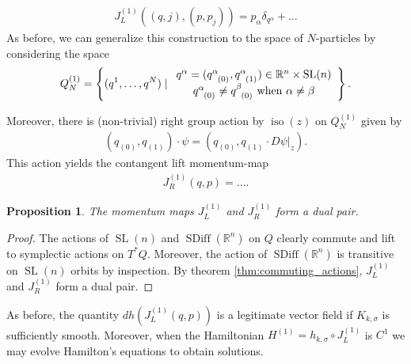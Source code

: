\documentclass[12pt]{amsart}
\newcommand{\R}{\ensuremath{\mathbb{R}}}
\newtheorem{prop}[thm]{Proposition}
\DeclareMathOperator{\SDiff}{SDiff}
\DeclareMathOperator{\SL}{SL}
\DeclareMathOperator{\iso}{iso}
\begin{document}
  \begin{align*}
    J_L^{(1)}( (q, j ),(p, p_j) ) = p_\alpha \delta_{q^{\alpha}} + \dots
  \end{align*}
  As before, we can generalize this construction to the space of
  $N$-particles by considering the space
  \begin{align*}
    Q^{(1)}_N = \left\{  ( q^1 , \dots, q^N ) \mid 
      \begin{array}{c}
        q^\alpha = (q\indices{^\alpha_{(0)} } ,q\indices{^\alpha_{(1)} } ) \in \R^n \times \SL(n) \\
        q\indices{^\alpha_{(0)}} \neq q\indices{^\beta_{(0)}} \text{ when } \alpha \neq \beta
      \end{array} \right\}. 
  \end{align*}

  Moreover, there is (non-trivial) right group action by $\iso(z)$ on $Q^{(1)}_N$ given by
  \begin{align*}
    (q_{(0)} , q_{(1)} ) \cdot \psi = (q_{(0)} , q_{(1)} \cdot D\psi|_z).
  \end{align*}
  This action yields the contangent lift momentum-map
  \begin{align*}
    J_R^{(1)}( q,p) = ....
  \end{align*}
  \begin{prop}
    The momentum maps $J_L^{(1)}$ and $J_R^{(1)}$ form a dual pair.
  \end{prop}
  \begin{proof}
    The actions of $\SL(n)$ and $\SDiff(\R^n)$ on $Q$ clearly commute
    and lift to symplectic actions on $T^*Q$.
    Moreover, the action of $\SDiff(\R^n)$ is transitive on $\SL(n)$ orbits
    by inspection.
    By theorem \ref{thm:commuting_actions}, $J_L^{(1)}$ and $J_R^{(1)}$ form a dual pair.
  \end{proof}

  As before, the quantity $dh( J_L^{(1)}(q,p))$ is a legitimate vector field
  if $K_{k,\sigma}$ is sufficiently smooth.  Moreover, when the Hamiltonian
  $H^{(1)} = h_{k,\sigma} \circ J_L^{(1)}$ is $C^1$ we may evolve Hamilton's equations
  to obtain solutions.
  
\end{document}
